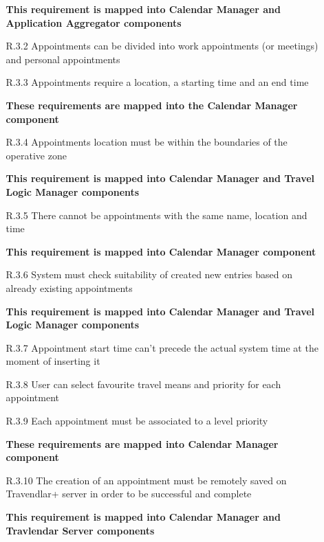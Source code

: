 \begin{itemize}
\begin{itemize}
			\textbf{This requirement is mapped into Calendar Manager and Application Aggregator components}

			\item [R.3.2] Appointments can be divided into work appointments (or meetings) and personal appointments

			\item [R.3.3] Appointments require a location, a starting time and an end time
			
			\textbf{These requirements are mapped into the Calendar Manager component}

			\item [R.3.4] Appointments location must be within the boundaries of the operative zone
			
			\textbf{This requirement is mapped into Calendar Manager and Travel Logic Manager components}

			\item [R.3.5] There cannot be appointments with the same name, location and time
			
			\textbf{This requirement is mapped into Calendar Manager component}

			\item [R.3.6] System must check suitability of created new entries based on already existing appointments
			
			\textbf{This requirement is mapped into Calendar Manager and Travel Logic Manager components}

			\item [R.3.7] Appointment start time can't precede the actual system time at the moment of inserting it                                 							
			\item [R.3.8] User can select favourite travel means and priority for each appointment

			\item [R.3.9] Each appointment must be associated to a level priority
			
			\textbf{These requirements are mapped into Calendar Manager component}

			\item [R.3.10] The creation of an appointment must be remotely saved on Travendlar+ server in order to be successful and complete
			
			\textbf{This requirement is mapped into Calendar Manager and Travlendar Server components}

		\end{itemize}






\end{itemize}
